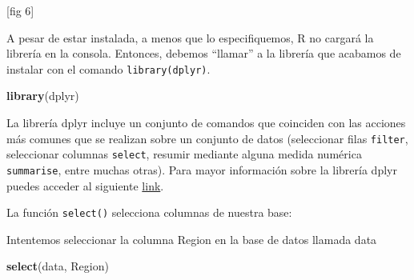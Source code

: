 \documentclass[]{book}
\newenvironment{Shaded}{\begin{snugshade}}{\end{snugshade}}
\newcommand{\KeywordTok}[1]{\textcolor[rgb]{0.13,0.29,0.53}{\textbf{#1}}}
\newcommand{\NormalTok}[1]{#1}
\begin{document}
{[}fig 6{]}

A pesar de estar instalada, a menos que lo especifiquemos, R no cargará la librería en la consola. Entonces,
debemos ``llamar'' a la librería que acabamos de instalar con el comando \texttt{library(dplyr)}.

\begin{Shaded}
\begin{Highlighting}[]
\KeywordTok{library}\NormalTok{(dplyr)}
\end{Highlighting}
\end{Shaded}

La librería dplyr incluye un conjunto de comandos que coinciden con las acciones más comunes que se
realizan sobre un conjunto de datos (seleccionar filas \texttt{filter}, seleccionar columnas \texttt{select}, resumir mediante
alguna medida numérica \texttt{summarise}, entre muchas otras). Para mayor información sobre la librería dplyr
puedes acceder al siguiente \href{https://rpubs.com/joser/dplyr}{link}.

La función \texttt{select()} selecciona columnas de nuestra base:

Intentemos seleccionar la columna Region en la base de datos llamada data

\begin{Shaded}
\begin{Highlighting}[]
\KeywordTok{select}\NormalTok{(data, Region)}
\end{Highlighting}
\end{Shaded}
\end{document}
